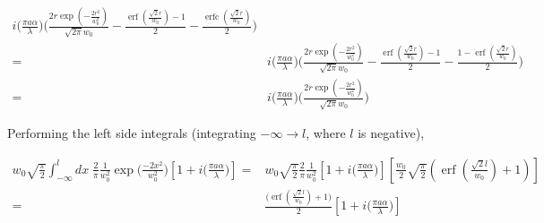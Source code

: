 \documentclass[aps,twoside,secnumarabic,balancelastpage,amsmath,amssymb,nofootinbib,hyperref=pdftex]{revtex4}
\begin{document}
\begin{align*}
            			i  
				\big( \frac{\pi a \alpha}{ \lambda} \big)
                \Bigg(
                        	\frac
                        	{2 r \exp({-\frac{2r^2}{w_0^2}})}
                        	{ \sqrt{2 \pi} w_0}
                        	-
                        	\frac{
                        	\operatorname{erf}
                        		\left(
                        		\frac{\sqrt{2}r}{w_0}
                        		\right)
                        	-
                        	1
                        	}
                        	{2}
                        	-
                    	\frac{
							\operatorname{erfc}( \frac{\sqrt{2} r}{w_0})
							}
							{
							2  
							}
                \Bigg)
                           \\=&
            			i  
				\big( \frac{\pi a \alpha}{ \lambda} \big)
                \Bigg(
                        	\frac
                        	{2 r \exp({-\frac{2r^2}{w_0^2}})}
                        	{ \sqrt{2 \pi} w_0}
                        	-
                        	\frac{
                        	\operatorname{erf}
                        		\left(
                        		\frac{\sqrt{2}r}{w_0}
                        		\right)
                        	-
                        	1
                        	}
                        	{2}
                        	-
                    	\frac{
                    	1-
							\operatorname{erf}( \frac{\sqrt{2} r}{w_0})
							}
							{
							2  
							}
                \Bigg)
                                           \\=&
            			i  
				\big( \frac{\pi a \alpha}{ \lambda} \big)
                \Bigg(
                        	\frac
                        	{2 r \exp({-\frac{2r^2}{w_0^2}})}
                        	{ \sqrt{2 \pi} w_0}
                \Bigg)                                        
\end{align*}


Performing the left side integrals (integrating $-\infty \rightarrow l$, where $l$ is negative), 

\begin{align*}
w_0 \sqrt{ \frac{\pi}{2} }   \int_{-\infty}^{l} dx \;
\frac{2}{\pi}
		\frac{1}{w_0^2}
		\exp \big( \frac{-2 x^2}{w_0^{2}} \big)
        \left[
				1+
				i \big( \frac{ \pi a \alpha}{ \lambda} \big)
			\right]
            =&
w_0 \sqrt{ \frac{\pi}{2} }
\frac{2}{\pi}
		\frac{1}{w_0^2}
        \left[
				1+
				i \big( \frac{ \pi a \alpha}{ \lambda} \big)
			\right] 
         \left[
             \frac{w_0}{2} \sqrt{\frac{\pi}{2}} 
             (
             \operatorname{erf}
             (\frac{\sqrt{2} l}{w_0})
             +1
             )
         \right]
                    \\ =&
         { \frac{             \big(
             \operatorname{erf}(\frac{\sqrt{2} l}{w_0})
             +1
             \big)
         	}{2} }
        \left[
				1+
				i \big( \frac{ \pi a \alpha}{ \lambda} \big)
			\right] 
\end{align*}
\end{document}
